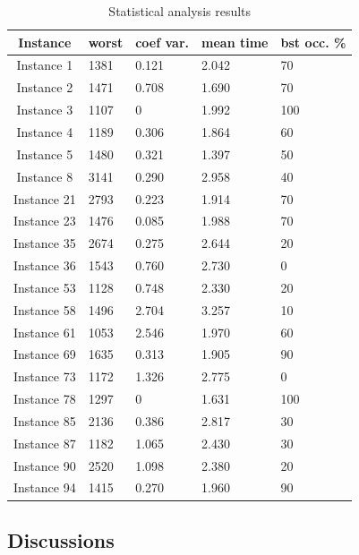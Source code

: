 \documentclass[twocolumn,10pt]{asme2ej}
\begin{document}
\begin{table}[t]
\caption{Statistical analysis results}
\begin{center}
\begin{tabular}{|c|l|l|l|l|}
\hline
Instance & worst & coef var. & mean time & bst occ. \% \\
\hline
Instance 1 & 1381 & 0.121 & 2.042 & 70 \\
Instance 2 & 1471 & 0.708 & 1.690 & 70 \\
Instance 3 & 1107 & 0 & 1.992 & 100 \\
Instance 4 & 1189 & 0.306 & 1.864 & 60 \\
Instance 5 & 1480 & 0.321 & 1.397 & 50 \\
Instance 8 & 3141 & 0.290 & 2.958 & 40 \\
Instance 21 & 2793 & 0.223 & 1.914 & 70 \\
Instance 23 & 1476 & 0.085 & 1.988 & 70 \\
Instance 35 & 2674 & 0.275 & 2.644 & 20 \\
Instance 36 & 1543 & 0.760 & 2.730 & 0 \\
Instance 53 & 1128 & 0.748 & 2.330 & 20 \\
Instance 58 & 1496 & 2.704 & 3.257 & 10 \\
Instance 61 & 1053 & 2.546 & 1.970 & 60 \\
Instance 69 & 1635 & 0.313 & 1.905 & 90 \\
Instance 73 & 1172 & 1.326 & 2.775 & 0 \\
Instance 78 & 1297 & 0 & 1.631 & 100 \\
Instance 85 & 2136 & 0.386 & 2.817 & 30 \\
Instance 87 & 1182 & 1.065 & 2.430 & 30 \\
Instance 90 & 2520  & 1.098 & 2.380 & 20 \\
Instance 94 & 1415 & 0.270 & 1.960 & 90 \\

\hline
\end{tabular}
\end{center}
\end{table}

\subsection{Discussions}
\end{document}
